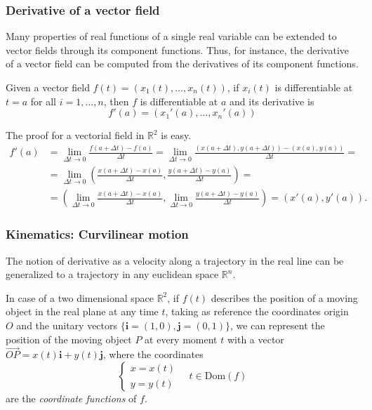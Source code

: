 \begin{frame}
\frametitle{Derivative of a vector field}
Many properties of real functions of a single real variable can be extended to vector fields through its component functions.
Thus, for instance, the derivative of a vector field can be computed from the derivatives of its component functions.

\begin{theorem}
Given a vector field $f(t)=(x_1(t),\ldots,x_n(t))$, if $x_i(t)$ is differentiable at $t=a$ for all $i=1,\ldots,n$, then $f$ is differentiable at $a$ and its derivative is
\[
f'(a)=(x_1'(a),\ldots,x_n'(a))
\]
\end{theorem}

The proof for a vectorial field in $\mathbb{R}^2$ is easy.
\begin{align*}
f'(a)&=\lim_{\Delta t\rightarrow 0} \frac{f(a+\Delta t)-f(a)}{\Delta t} = \lim_{\Delta t\rightarrow 0} \frac{(x(a+\Delta t),y(a+\Delta t))-(x(a),y(a))}{\Delta t} =\\
&=  \lim_{\Delta t\rightarrow 0} \left(\frac{x(a+\Delta t)-x(a)}{\Delta t},\frac{y(a+\Delta t)-y(a)}{\Delta t}\right) =\\
&= \left(\lim_{\Delta t\rightarrow 0}\frac{x(a+\Delta t)-x(a)}{\Delta t},\lim_{\Delta t\rightarrow 0}\frac{y(a+\Delta t)-y(a)}{\Delta t}\right) =
(x'(a),y'(a)).
\end{align*}
\end{frame}


\begin{frame}
\frametitle{Kinematics: Curvilinear motion}
The notion of derivative as a velocity along a trajectory in the real line can be generalized to a trajectory in any euclidean space $\mathbb{R}^n$.

In case of a two dimensional space $\mathbb{R}^2$, if $f(t)$ describes the position of a moving object in the real plane at any time $t$, taking as reference the coordinates origin $O$ and the unitary vectors $\{\mathbf{i}=(1,0),\mathbf{j}=(0,1)\}$, we can represent the position of the moving object $P$ at every moment $t$ with a vector $\vec{OP}=x(t)\mathbf{i}+y(t)\mathbf{j}$, where the coordinates
\[
\begin{cases}
x=x(t)\\
y=y(t)
\end{cases}
\quad
t\in \mbox{Dom}(f)
\]
are the \emph{coordinate functions} of $f$.

\begin{center}
\end{center}
\end{frame}


